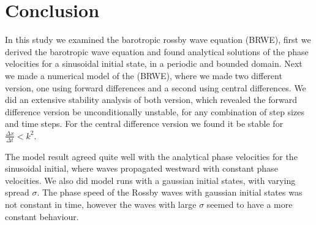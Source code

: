 \section{Conclusion}
In this study we examined the barotropic rossby wave equation (BRWE), first we derived
the barotropic wave equation and found analytical solutions of the phase
velocities for a sinusoidal initial state, in a periodic and bounded domain.
Next we made a numerical model of the (BRWE), where we made two different
version, one using forward differences and a second using central differences.
We did an extensive stability analysis of both version, which revealed the
forward difference version be unconditionally unstable, for any combination of
step sizes and time steps. For the central difference version we found it be
stable for $\frac{\Delta x}{\Delta t} < k^2$. 

The model result agreed quite well with the analytical phase velocities for the
sinusoidal initial, where waves propagated westward with constant
phase velocities. We also did model runs with a gaussian initial states, with
varying spread $\sigma$. The phase speed of the Rossby waves with gaussian
initial states was not constant in time, however the waves with large $\sigma$
seemed to have a more constant behaviour. 
